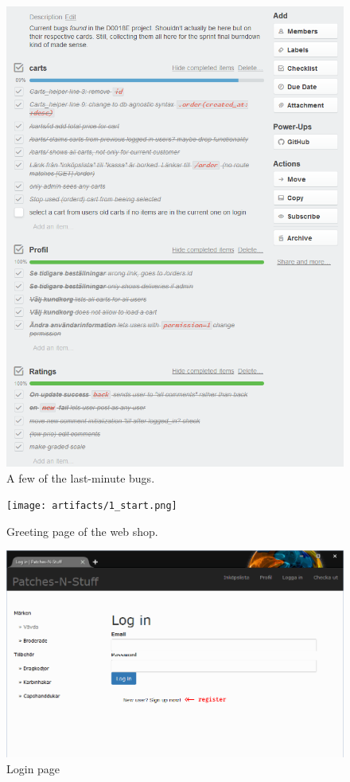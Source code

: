 \documentclass[paper=a4, fontsize=11pt]{report} %
\begin{document}
\begin{itemize}
\begin{figure}
	\includegraphics{artifacts/bugs}
	\caption{A few of the last-minute bugs.}
	\label{fig:bugs}
\end{figure}


\begin{figure}
	\texttt{[image: artifacts/1\_start.png]}
	\caption{Greeting page of the web shop.}
	\label{fig:start}
\end{figure}

\begin{figure}
	\includegraphics[width=0.9\paperwidth]{artifacts/stories/2_login.png}
	\caption{Login page}
	\label{fig:login}
\end{figure}


\end{itemize}
\end{document}
